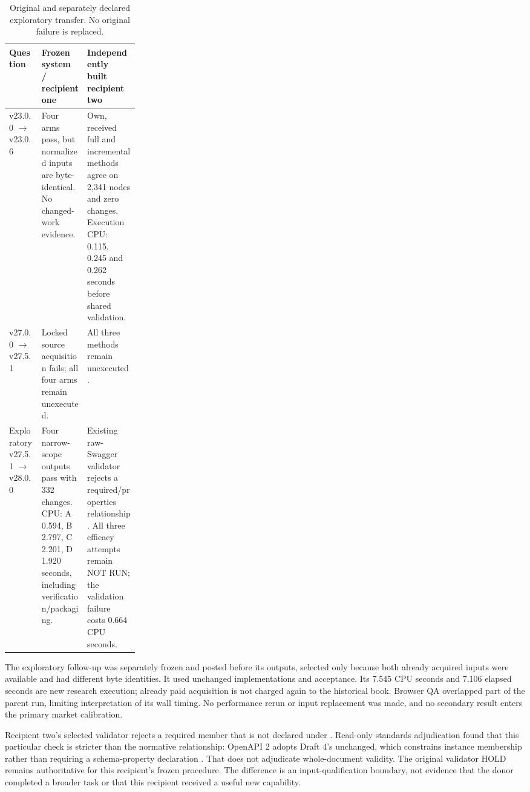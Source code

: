 \begin{table}[htbp]\small
\caption{Original and separately declared exploratory transfer. No original failure is replaced.}
\begin{tabularx}{\linewidth}{@{}p{0.25\linewidth}YY@{}}
\toprule Question & Frozen system / recipient one & Independently built recipient two\\ \midrule
v23.0.0 $\rightarrow$ v23.0.6 &
Four arms pass, but normalized inputs are byte-identical. No changed-work evidence. &
Own, received full and incremental methods agree on 2,341 nodes and zero changes.
Execution CPU: 0.115, 0.245 and 0.262 seconds before shared validation.\\
v27.0.0 $\rightarrow$ v27.5.1 &
Locked source acquisition fails; all four arms remain unexecuted. &
All three methods remain unexecuted.\\
Exploratory v27.5.1 $\rightarrow$ v28.0.0 &
Four narrow-scope outputs pass with 332 changes. CPU: A 0.594, B 2.797,
C 2.201, D 1.920 seconds, including verification/packaging. &
Existing raw-Swagger validator rejects a required/properties relationship.
All three efficacy attempts remain NOT RUN; the validation failure costs 0.664 CPU seconds.\\
\bottomrule
\end{tabularx}
\end{table}

The exploratory follow-up was separately frozen and posted before its outputs, selected only
because both already acquired inputs were available and had different byte identities. It
used unchanged implementations and acceptance. Its 7.545 CPU seconds and 7.106 elapsed seconds
are new research execution; already paid acquisition is not charged again to the historical
book. Browser QA overlapped part of the parent run, limiting interpretation of its wall timing.
No performance rerun or input replacement was made, and no secondary result enters the primary
market calibration.

Recipient two's selected validator rejects a required  member that is not
declared under . Read-only standards adjudication found that this particular
check is stricter than the normative relationship: OpenAPI 2 adopts Draft 4's 
unchanged, which constrains instance membership rather than requiring a schema-property
declaration \cite{oas2,draft4}. That does not adjudicate whole-document validity. The original
validator HOLD remains authoritative for this recipient's frozen procedure. The difference
is an input-qualification boundary, not evidence that the donor completed a broader task or
that this recipient received a useful new capability.
